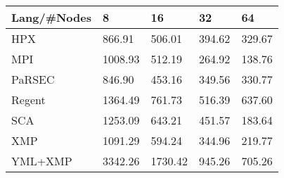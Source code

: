 \begin{tabularx}{\textwidth}{CCCCC}
Lang/#Nodes& 8 & 16 & 32 & 64 \\ \hline
HPX & 866.91 & 506.01 & 394.62 & 329.67 \\
MPI & 1008.93 & 512.19 & 264.92 & 138.76 \\
PaRSEC & 846.90 & 453.16 & 349.56 & 330.77 \\
Regent & 1364.49 & 761.73 & 516.39 & 637.60 \\
SCA & 1253.09 & 643.21 & 451.57 & 183.64 \\
XMP & 1091.29 & 594.24 & 344.96 & 219.77 \\
YML+XMP & 3342.26 & 1730.42 & 945.26 & 705.26 \\
\hline
\end{tabularx}
